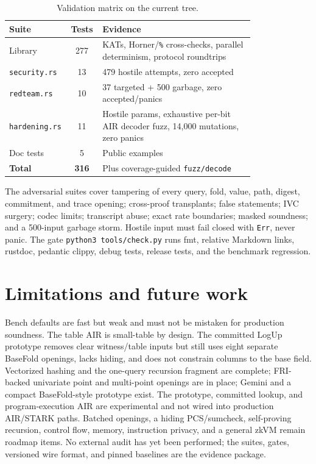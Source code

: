 \documentclass[11pt,a4paper]{article}
\begin{document}
\begin{table}[h]
\centering
\small
\begin{tabular}{@{}L{0.18\linewidth}cL{0.62\linewidth}@{}}
\toprule
Suite & Tests & Evidence \\
\midrule
Library & 277 & KATs, Horner/\texttt{\%} cross-checks, parallel determinism, protocol roundtrips \\
\texttt{security.rs} & 13 & 479 hostile attempts, zero accepted \\
\texttt{redteam.rs} & 10 & 37 targeted + 500 garbage, zero accepted/panics \\
\texttt{hardening.rs} & 11 & Hostile params, exhaustive per-bit AIR decoder fuzz, 14,000 mutations, zero panics \\
Doc tests & 5 & Public examples \\
\textbf{Total} & \textbf{316} & Plus coverage-guided \texttt{fuzz/decode} \\
\bottomrule
\end{tabular}
\caption{Validation matrix on the current tree.}
\end{table}

The adversarial suites cover tampering of every query, fold, value, path,
digest, commitment, and trace opening; cross-proof transplants; false
statements; IVC surgery; codec limits; transcript abuse; exact rate
boundaries; masked soundness; and a 500-input garbage storm. Hostile input
must fail closed with \texttt{Err}, never panic. The gate
\texttt{python3 tools/check.py} runs fmt, relative Markdown links, rustdoc,
pedantic clippy, debug tests, release tests, and the benchmark regression.

\section{Limitations and future work}

Bench defaults are fast but weak and must not be mistaken for production
soundness. The table AIR is small-table by design. The committed LogUp
prototype removes clear witness/table inputs but still uses eight separate
BaseFold openings, lacks hiding, and does not constrain columns to the base
field. Vectorized hashing and the one-query recursion fragment are complete;
FRI-backed univariate point and multi-point openings are in place; Gemini and
a compact BaseFold-style prototype exist. The prototype, committed lookup,
and program-execution AIR are experimental and not wired into production
AIR/STARK paths. Batched openings, a hiding PCS/sumcheck, self-proving
recursion, control flow, memory, instruction privacy, and a general zkVM
remain roadmap items. No external audit has yet been performed; the suites,
gates, versioned wire format, and pinned baselines are the evidence package.
\end{document}
